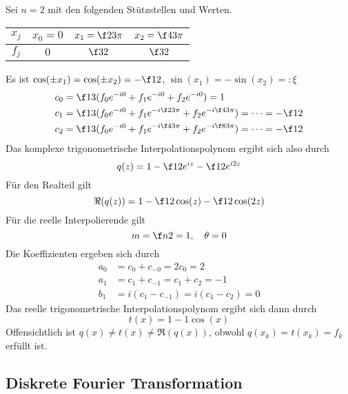 \documentclass[11pt]{scrbook}
\begin{document}
\begin{ex*}
	Sei $n=2$ mit den folgenden Stützstellen und Werten. \\
	\begin{table}[H]
		\centering
		\begin{tabular}{c|c|c|c}
			$x_j$ & $x_0=0$ & $x_1=\f 23 \pi$ & $x_2=\f 43 \pi$\\\hline
			$f_j$ & $0$ & $\f 32$ & $\f 32$
		\end{tabular}
	\end{table}
	Es ist $\cos(\pm x_1) = \cos(\pm x_2) = -\f 12$, $\sin(x_1) = -\sin(x_2) =: \xi $
	\begin{align*}
		c_0 &= \f 13 (f_0e^{-i0} + f_1 e^{-i0} + f_2e^{-i0}) = 1\\
		c_1 &= \f 13 (f_0e^{-i0} + f_1 e^{-i\f 23 \pi} + f_2 e^{-i \f 43 \pi}) = \dotsb = -\f 12\\
		c_2 &= \f 13 (f_0e^{-i0} + f_1 e^{-i \f 43 \pi} + f_2 e^{-i \f 83 \pi}) = \dotsb = -\f 12
	\end{align*}
	Das komplexe trigonometrische Interpolationspolynom ergibt sich also durch
	\[
		q(z) = 1 - \f 12 e^{iz} - \f 12 e^{i2z}
	\]
	Für den Realteil gilt
	\[
		\Re(q(z)) = 1 - \f 12 \cos(z) - \f 12 \cos(2z)
	\]
	Für die reelle Interpolierende gilt
	\[
		m = \f n2 = 1,\quad \theta =0
	\]
	Die Koeffizienten ergeben sich durch
	\begin{align*}
		a_0 &= c_0 + c_{-0} = 2c_0 = 2\\
		a_1 &= c_1 + c_{-1} = c_1 + c_2 = -1\\
		b_1 &= i(c_1-c_{-1}) = i(c_1-c_2) = 0
	\end{align*}
	Das reelle trigonometrische Interpolationspolynom ergibt sich dann durch
	\[
		t(x) = 1 - 1 \cos(x)
	\]
	Offensichtlich ist $q(x)\neq t(x) \neq \Re(q(x))$, obwohl $q(x_k) = t(x_k) = f_k$ erfüllt ist.
\end{ex*}

\subsection{Diskrete Fourier Transformation}
\end{document}
